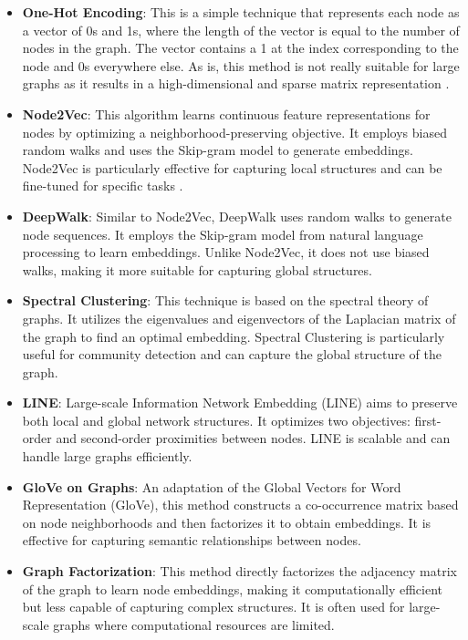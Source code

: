     \begin{itemize}
        \item \textbf{One-Hot Encoding}: This is a simple technique that represents each node as a vector of 0s and 1s, where the length of the vector is equal to the number of nodes in the graph. The vector contains a 1 at the index corresponding to the node and 0s everywhere else. As is, this method is not really suitable for large graphs as it results in a high-dimensional and sparse matrix representation \cite{KG22}.
        
        \item \textbf{Node2Vec}: This algorithm learns continuous feature representations for nodes by optimizing a neighborhood-preserving objective. It employs biased random walks and uses the Skip-gram model to generate embeddings. Node2Vec is particularly effective for capturing local structures and can be fine-tuned for specific tasks \cite{KG22}.
        
        \item \textbf{DeepWalk}: Similar to Node2Vec, DeepWalk uses random walks to generate node sequences. It employs the Skip-gram model from natural language processing to learn embeddings. Unlike Node2Vec, it does not use biased walks, making it more suitable for capturing global structures.
        
        \item \textbf{Spectral Clustering}: This technique is based on the spectral theory of graphs. It utilizes the eigenvalues and eigenvectors of the Laplacian matrix of the graph to find an optimal embedding. Spectral Clustering is particularly useful for community detection and can capture the global structure of the graph.
        
        \item \textbf{LINE}: Large-scale Information Network Embedding (LINE) aims to preserve both local and global network structures. It optimizes two objectives: first-order and second-order proximities between nodes. LINE is scalable and can handle large graphs efficiently.
        
        \item \textbf{GloVe on Graphs}: An adaptation of the Global Vectors for Word Representation (GloVe), this method constructs a co-occurrence matrix based on node neighborhoods and then factorizes it to obtain embeddings. It is effective for capturing semantic relationships between nodes.
        
        \item \textbf{Graph Factorization}: This method directly factorizes the adjacency matrix of the graph to learn node embeddings, making it computationally efficient but less capable of capturing complex structures. It is often used for large-scale graphs where computational resources are limited.
        

\end{itemize}
